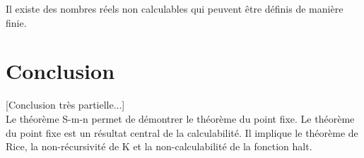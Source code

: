 \begin{myprop}
	Il existe des nombres réels non calculables qui peuvent être définis de
	manière finie.
\end{myprop}


\section{Conclusion}
[Conclusion très partielle...]\\
Le théorème S-m-n permet de démontrer le théorème du point fixe.
Le théorème du point fixe est un résultat central de la calculabilité. Il
implique le théorème de Rice, la non-récursivité de K et la non-calculabilité
de la fonction halt.

